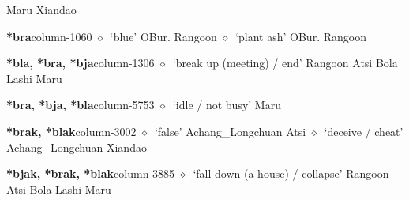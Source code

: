 \hspace{1ex}
         Maru 
\hspace{1ex}
         Xiandao 
  \item {\footnotesize \textbf{*bra}}{\tiny column-1060}
         $\diamond$~`blue'
         OBur. 
\hspace{1ex}
         Rangoon 
\hspace{1ex}
         $\diamond$~`plant ash'
         OBur. 
\hspace{1ex}
         Rangoon 
  \item {\footnotesize \textbf{*bla, *bra, *bja}}{\tiny column-1306}
         $\diamond$~`break up (meeting) / end'
         Rangoon 
\hspace{1ex}
         Atsi 
\hspace{1ex}
         Bola 
\hspace{1ex}
         Lashi 
\hspace{1ex}
         Maru 
  \item {\footnotesize \textbf{*bra, *bja, *bla}}{\tiny column-5753}
         $\diamond$~`idle / not busy'
         Maru 
  \item {\footnotesize \textbf{*brak, *blak}}{\tiny column-3002}
         $\diamond$~`false'
         Achang\_Longchuan 
\hspace{1ex}
         Atsi 
\hspace{1ex}
         $\diamond$~`deceive / cheat'
         Achang\_Longchuan 
\hspace{1ex}
         Xiandao 
  \item {\footnotesize \textbf{*bjak, *brak, *blak}}{\tiny column-3885}
         $\diamond$~`fall down (a house) / collapse'
         Rangoon 
\hspace{1ex}
         Atsi 
\hspace{1ex}
         Bola 
\hspace{1ex}
         Lashi 
\hspace{1ex}
         Maru 
